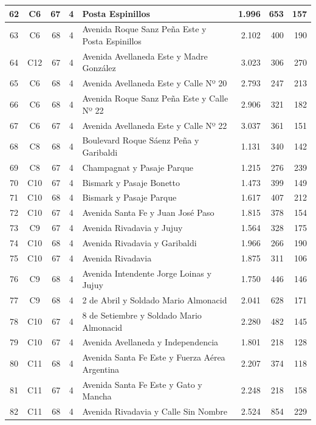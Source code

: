 \begin{longtable}{|c|c|r|c|p{4.2cm}|r|r|r|}
62 & C6 & 67 & 4 & Posta Espinillos & 1.996 & 653 & 157 \\ \hline
63 & C6 & 68 & 4 & Avenida Roque Sanz Peña Este y Posta Espinillos & 2.102 & 400 & 190 \\ \hline
64 & C12 & 67 & 4 & Avenida Avellaneda Este y Madre González & 3.023 & 306 & 270 \\ \hline
65 & C6 & 68 & 4 & Avenida Avellaneda Este y Calle Nº 20 & 2.793 & 247 & 213 \\ \hline
66 & C6 & 68 & 4 & Avenida Roque Sanz Peña Este y Calle Nº 22 & 2.906 & 321 & 182 \\ \hline
67 & C6 & 67 & 4 & Avenida Avellaneda Este y Calle Nº 22 & 3.037 & 361 & 151 \\ \hline
68 & C8 & 68 & 4 & Boulevard Roque Sáenz Peña y Garibaldi & 1.131 & 340 & 142 \\ \hline
69 & C8 & 67 & 4 & Champagnat y Pasaje Parque & 1.215 & 276 & 239 \\ \hline
70 & C10 & 67 & 4 & Bismark y Pasaje Bonetto & 1.473 & 399 & 149 \\ \hline
71 & C10 & 68 & 4 & Bismark y Pasaje Parque & 1.617 & 407 & 212 \\ \hline
72 & C10 & 67 & 4 & Avenida Santa Fe y Juan José Paso & 1.815 & 378 & 154 \\ \hline
73 & C9 & 67 & 4 & Avenida Rivadavia y Jujuy & 1.564 & 328 & 175 \\ \hline
74 & C10 & 68 & 4 & Avenida Rivadavia y Garibaldi & 1.966 & 266 & 190 \\ \hline
75 & C10 & 67 & 4 & Avenida Rivadavia & 1.875 & 311 & 106 \\ \hline
76 & C9 & 68 & 4 & Avenida Intendente Jorge Loinas y Jujuy & 1.750 & 446 & 146 \\ \hline
77 & C9 & 68 & 4 & 2 de Abril y Soldado Mario Almonacid & 2.041 & 628 & 171 \\ \hline
78 & C10 & 67 & 4 & 8 de Setiembre y Soldado Mario Almonacid & 2.280 & 482 & 145 \\ \hline
79 & C10 & 67 & 4 & Avenida Avellaneda y Independencia & 1.801 & 218 & 128 \\ \hline
80 & C11 & 68 & 4 & Avenida Santa Fe Este y Fuerza Aérea Argentina & 2.207 & 374 & 118 \\ \hline
81 & C11 & 67 & 4 & Avenida Santa Fe Este y Gato y Mancha & 2.248 & 218 & 158 \\ \hline
82 & C11 & 68 & 4 & Avenida Rivadavia y Calle Sin Nombre & 2.524 & 854 & 229 \\ \hline

\end{longtable}
